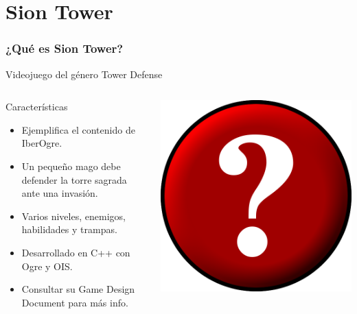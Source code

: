 \documentclass[green]{beamer}
\begin{document}
\section{Sion Tower}

\begin{frame}
	\frametitle{¿Qué es Sion Tower?}
    
    Videojuego del género Tower Defense
    
    \begin{columns}[c]
		\column{225pt}
        
		\begin{block}{Características}
            \begin{itemize}
                \item Ejemplifica el contenido de IberOgre.
                \item Un pequeño mago debe defender la torre sagrada ante una invasión.
                \item Varios niveles, enemigos, habilidades y trampas.
                \item Desarrollado en C++ con Ogre y OIS.
                \item Consultar su Game Design Document para más info.
            \end{itemize}            
        \end{block}

		\column{100pt}
        
		\begin{center}
			\includegraphics[scale=0.14]{img/logo-siontower.png}
		\end{center}
	\end{columns} 
\end{frame}
\end{document}
